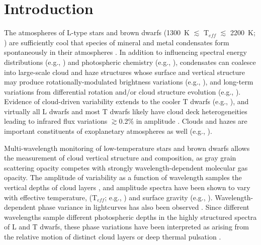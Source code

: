 \documentclass[twocolumn]{aastex6}
\newcommand{\teff}{T$_{eff}$}
\begin{document}



\section{Introduction}

The atmospheres of L-type stars and brown dwarfs (1300~K $\lesssim$ {\teff} $\lesssim$ 2200~K; \citealt{2015ApJ...810..158F}) are sufficiently cool that species of mineral and metal condensates form spontaneously in their atmospheres \citep{1996A&A...305L...1T,2010ApJ...716.1060V}.
In addition to influencing spectral energy distributions (e.g., \citealt{2001ApJ...556..357A,2008ApJ...674..451B}) and photospheric chemistry (e.g., \citealt{2000ApJ...531..438B}), condensates can coalesce into large-scale cloud and haze structures \citep{1989ApJ...338..314L,2001ApJ...556..872A,2014Natur.505..654C}
whose surface and vertical structure may produce rotationally-modulated brightness variations (e.g., \citealt{2012ApJ...750..105R}), and long-term variations from differential rotation and/or cloud structure evolution (e.g., \citealt{2009ApJ...701.1534A,2013A&A...555L...5G,2016ApJ...826....8Y}). Evidence of cloud-driven variability extends to the cooler T dwarfs (e.g., \citealt{2009ApJ...701.1534A,2012ApJ...760L..31B,2015ApJ...799..154M}), and virtually all L dwarfs and most T dwarfs likely have cloud deck heterogeneities leading to infrared flux variations $\gtrsim$0.2\% in amplitude \citep{2015ApJ...799..154M}. Clouds and hazes are important constituents of exoplanetary atmospheres as well (e.g., \citealt{2011ApJ...733...65B,2014Natur.505...69K,2016Natur.529...59S}).

Multi-wavelength monitoring of low-temperature stars and brown dwarfs allows the measurement of cloud vertical structure and composition, as gray grain scattering opacity competes with strongly wavelength-dependent molecular gas opacity. The amplitude of variability as a function of wavelength samples the vertical depths of cloud layers \citep{2013ApJ...768..121A}, and amplitude spectra have been shown to vary with effective temperature, ({\teff}; e.g., \citealt{2015ApJ...798L..13Y}) and surface gravity (e.g., \citealt{2016ApJ...829L..32L}).
Wavelength-dependent phase variance in lightcurves has also been observed \citep{2012ApJ...760L..31B,2013ApJ...778L..10B,2016ApJ...826....8Y}.
Since different wavelengths sample different photospheric depths in the highly structured spectra of L and T dwarfs, these phase variations have been interpreted as arising from the relative motion of distinct cloud layers or deep thermal pulsation \citep{2014ApJ...785..158R}. 
\end{document}
